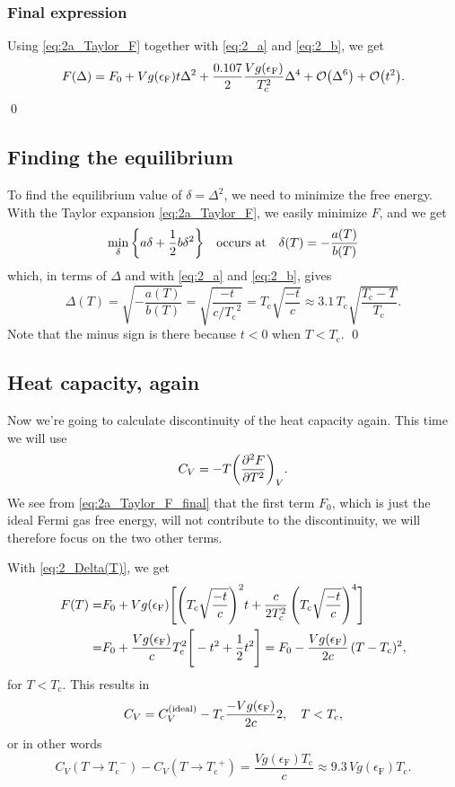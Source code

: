 \documentclass[11pt,letter, swedish, english
]{article}
\newcommand{\Tc}{\ensuremath{T_{\text{c}}}}
\newcommand{\eF}{\ensuremath{\epsilon_{\text{F}}}}
\begin{document}
\subsubsection{Final expression}
Using \eqref{eq:2a_Taylor_F} together with \eqref{eq:2_a} and
\eqref{eq:2_b}, we get
\begin{equation}\label{eq:2a_Taylor_F_final}
F(\Delta)=F_0+Vg(\eF)t\Delta^2 
+ \frac{0.107}{2}\frac{Vg(\eF)}{\Tc^2}\Delta^4 + \order{\Delta^6}+\order{t^2}.
\end{equation}
\qed


\subsection{Finding the equilibrium}
To find the equilibrium value of $\delta=\Delta^2$, we need to minimize
the free energy. With the Taylor expansion \eqref{eq:2a_Taylor_F}, we
easily minimize $F$, and we get
\begin{equation}
\min_{\delta}\qty{a\delta+\frac{1}{2}b\delta^2}\quad\text{occurs at}\quad
\delta(T)=-\frac{a(T)}{b(T)}
\end{equation}
which, in terms of $\Delta$ and with \eqref{eq:2_a} and
\eqref{eq:2_b}, gives
\begin{equation}\label{eq:2_Delta(T)}
\Delta(T)=\sqrt{-\frac{a(T)}{b(T)}}
=\sqrt{\frac{-t}{c/\Tc^2}}
=\Tc\sqrt{\frac{-t}{c}}\approx3.1\,\Tc\sqrt{\frac{\Tc-T}{\Tc}}.
\end{equation}
Note that the minus sign is there because $t<0$ when $T<\Tc$.
\qed

\subsection{Heat capacity, again}
Now we're going to calculate discontinuity of the heat capacity
again. This time we will use
\begin{equation}
C_V=-T\qty(\pdv[2]{F}{T})_V.
\end{equation}
We see from \eqref{eq:2a_Taylor_F_final} that the first term $F_0$,
which is just the ideal Fermi gas free energy, will not contribute to
the discontinuity, we will therefore focus on the two other terms. 

With \eqref{eq:2_Delta(T)}, we get
\begin{equation}
\begin{aligned}
F(T)=&F_0+Vg(\eF)\Bigg[
\qty(\Tc\sqrt{\frac{-t}{c}})^2 t+
\frac{c}{2\Tc^2}\,
\qty(\Tc\sqrt{\frac{-t}{c}})^4
\Bigg]\\
=&F_0+\frac{Vg(\eF)}{c}\Tc^2\Bigg[
-t^2+\frac{1}{2}t^2 \Bigg]
=F_0-\frac{Vg(\eF)}{2c}\,(T-\Tc)^2,
\end{aligned}
\end{equation}
for $T<\Tc$.
This results in
\begin{equation}
C_V=C_V^{\text{(ideal)}} - \Tc\frac{-Vg(\eF)}{2c}2
\qcomma
T<\Tc,
\end{equation}
or in other words
\begin{equation}
C_V(T\to\Tc^-)-C_V(T\to\Tc^+)=\frac{Vg(\eF)\Tc}{c}
\approx 9.3\,Vg(\eF)\Tc.
\end{equation}
\end{document}
